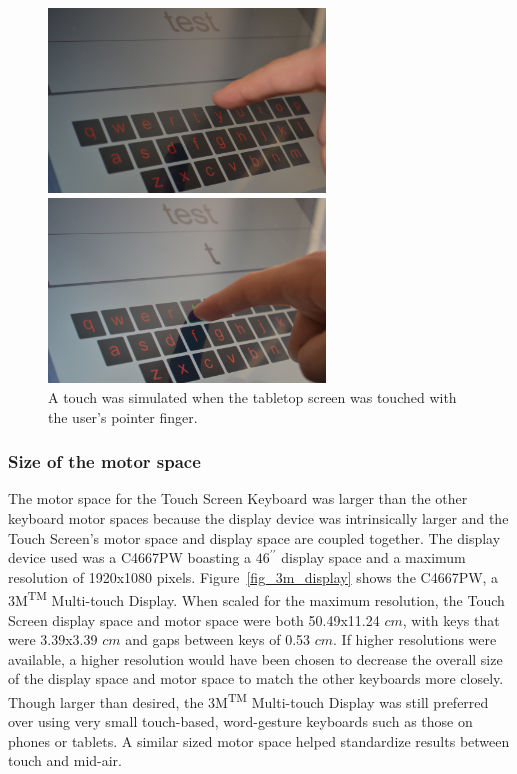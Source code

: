 \begin{figure}[h]
	\centering
	\begin{minipage}[t]{5.8in}
		\begin{minipage}[t]{2.85in}
			\includegraphics[width=2.9in]{Figures/fig_touch_screen_hover}
		\end{minipage}
		\begin{minipage}[t]{2.9in}
			\includegraphics[width=2.9in]{Figures/fig_touch_screen_press}
		\end{minipage}
	\end{minipage}
	\caption[Touch Screen Word Separation]{A touch was simulated when the tabletop screen was touched with the user's pointer finger.}
	\label{touch_screen_press_comparison}
\end{figure}

\subsubsection{Size of the motor space}
The motor space for the Touch Screen Keyboard was larger than the other keyboard motor spaces because the display device was intrinsically larger and the Touch Screen's motor space and display space are coupled together. The display device used was a C4667PW boasting a $46^{\prime\prime}$ display space and a maximum resolution of 1920x1080 pixels. Figure~\ref{fig_3m_display} shows the C4667PW, a 3M\textsuperscript{TM} Multi-touch Display. When scaled for the maximum resolution, the Touch Screen display space and motor space were both 50.49x11.24 $cm$, with keys that were 3.39x3.39 $cm$ and gaps between keys of 0.53 $cm$. If higher resolutions were available, a higher resolution would have been chosen to decrease the overall size of the display space and motor space to match the other keyboards more closely. Though larger than desired, the 3M\textsuperscript{TM} Multi-touch Display was still preferred over using very small touch-based, word-gesture keyboards such as those on phones or tablets. A similar sized motor space helped standardize results between touch and mid-air.

